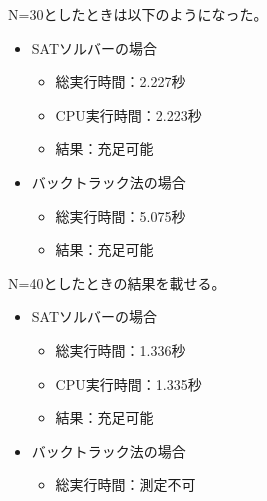 \documentclass[dvipdfmx]{jsarticle}
\begin{document}
N=30としたときは以下のようになった。
\begin{itemize}
  \item SATソルバーの場合
  \begin{itemize}
    \item 総実行時間：2.227秒
    \item CPU実行時間：2.223秒
    \item 結果：充足可能
  \end{itemize}
  \item バックトラック法の場合
  \begin{itemize}
    \item 総実行時間：5.075秒
    \item 結果：充足可能
  \end{itemize}
\end{itemize}
N=40としたときの結果を載せる。
\begin{itemize}
  \item SATソルバーの場合
  \begin{itemize}
    \item 総実行時間：1.336秒
    \item CPU実行時間：1.335秒
    \item 結果：充足可能
  \end{itemize}
  \item バックトラック法の場合
  \begin{itemize}
    \item 総実行時間：測定不可
  \end{itemize}
\end{itemize}
\end{document}
